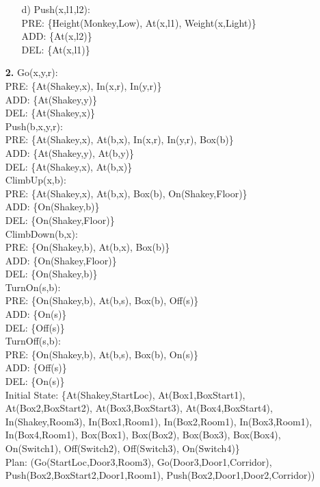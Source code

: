 \documentclass{article}
\begin{document}
\begin{enumerate}
\begin{enumerate}
\item[d)]
Push(x,l1,l2):\\
PRE: \{Height(Monkey,Low), At(x,l1), Weight(x,Light)\}\\
ADD: \{At(x,l2)\}\\
DEL: \{At(x,l1)\}\\
\end{enumerate}

\item[\textbf{2.}]
Go(x,y,r):\\
PRE: \{At(Shakey,x), In(x,r), In(y,r)\}\\
ADD: \{At(Shakey,y)\}\\
DEL: \{At(Shakey,x)\}\\
\vspace{6pt}
Push(b,x,y,r):\\
PRE: \{At(Shakey,x), At(b,x), In(x,r), In(y,r), Box(b)\}\\
ADD: \{At(Shakey,y), At(b,y)\}\\
DEL: \{At(Shakey,x), At(b,x)\}\\
\vspace{6pt}
ClimbUp(x,b):\\
PRE: \{At(Shakey,x), At(b,x), Box(b), On(Shakey,Floor)\}\\
ADD: \{On(Shakey,b)\}\\
DEL: \{On(Shakey,Floor)\}\\
\vspace{6pt}
ClimbDown(b,x):\\
PRE: \{On(Shakey,b), At(b,x), Box(b)\}\\
ADD: \{On(Shakey,Floor)\}\\
DEL: \{On(Shakey,b)\}\\
\vspace{6pt}
TurnOn(s,b):\\
PRE: \{On(Shakey,b), At(b,s), Box(b), Off(s)\}\\
ADD: \{On(s)\}\\
DEL: \{Off(s)\}\\
\vspace{6pt}
TurnOff(s,b):\\
PRE: \{On(Shakey,b), At(b,s), Box(b), On(s)\}\\
ADD: \{Off(s)\}\\
DEL: \{On(s)\}\\
\vspace{6pt}
Initial State: \{At(Shakey,StartLoc), At(Box1,BoxStart1), At(Box2,BoxStart2), At(Box3,BoxStart3), At(Box4,BoxStart4), In(Shakey,Room3), In(Box1,Room1), In(Box2,Room1), In(Box3,Room1), In(Box4,Room1), Box(Box1), Box(Box2), Box(Box3), Box(Box4), On(Switch1), Off(Switch2), Off(Switch3), On(Switch4)\}\\
\vspace{6pt}
Plan: (Go(StartLoc,Door3,Room3), Go(Door3,Door1,Corridor), Push(Box2,BoxStart2,Door1,Room1), Push(Box2,Door1,Door2,Corridor))


\end{enumerate}
\end{document}
